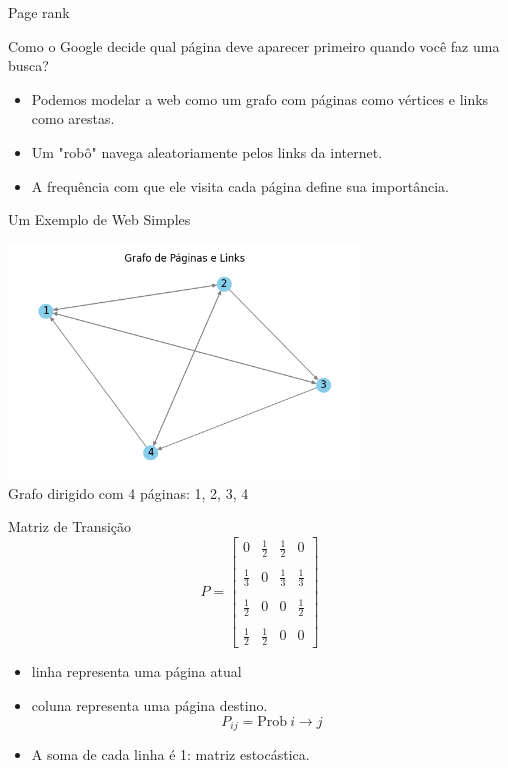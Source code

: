 \documentclass{beamer}
\begin{document}

\begin{frame}{Page rank}
\begin{block}{}
Como o Google decide qual página deve aparecer primeiro quando você faz uma busca?
\end{block}
\pause
\begin{itemize}
    \item Podemos modelar a web como um grafo com páginas como vértices e links como arestas.
    \item Um "robô" navega aleatoriamente pelos links da internet.
    \item A frequência com que ele visita cada página define sua importância.
\end{itemize}
\end{frame}


\begin{frame}{Um Exemplo de Web Simples}
\begin{center}
\includegraphics[width=0.7\textwidth]{web_grafo.png} \\
Grafo dirigido com 4 páginas: 1, 2, 3, 4
\end{center}
\end{frame}


\begin{frame}{Matriz de Transição}
  \[
    P = \begin{bmatrix}
      0 & \frac{1}{2} & \frac{1}{2} & 0 \\\\
      \frac{1}{3} & 0 & \frac{1}{3} & \frac{1}{3} \\\\
      \frac{1}{2} & 0 & 0 & \frac{1}{2} \\\\
      \frac{1}{2} & \frac{1}{2} & 0 & 0
    \end{bmatrix}
  \]
  \begin{itemize}
  \item  linha representa uma página atual
  \item coluna representa uma página destino.
      $$P_{ij} = \mathrm{Prob} ~i\to j$$%
  \item A soma de cada linha é 1: matriz estocástica.
  \end{itemize}
  
  
\end{frame}
\end{document}
